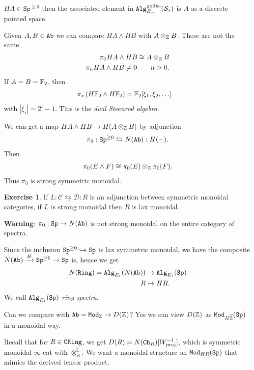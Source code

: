 \documentclass[12pt]{amsart}
\theoremstyle{definition}
\newtheorem{exercise}[theorem]{Exercise}
\newcommand{\HZ}{H\widetilde{\mathbb{Z}}}
\let\smashprod\wedge
\providecommand{\Sp}{\texttt{Sp}}
\providecommand{\Sp}{\text{Sp}}
\begin{document}
$HA \in \Sp^{\ge 0}$ then the associated element in $\texttt{Alg}_{E_\infty}^\text{gplike}(\mathcal{S}_\ast)$ is $A$ as a discrete pointed space.

Given $A,B\in \texttt{Ab}$ we can compare $HA \smashprod HB$ with $A \otimes_{\mathbb{Z}} B$. These are not the same.
\begin{align*}
    \pi_0 HA \smashprod HB \cong A \otimes_\Z B \\
    \pi_n HA \smashprod HB \ne 0 \quad\quad n>0.
\end{align*}
If $A=B=\mathbb{F}_2$, then
\begin{align*}
    \pi_\ast \left( H\F_2 \smashprod H\F_2 \right) &= \F_2[\xi_1,\xi_2,\ldots]
\end{align*}
with $|\xi_i|=2^i-1$. This is the \textit{dual Steenrod algebra}.

We can get a map $HA \smashprod HB \to H(A \otimes_\Z B)$ by adjunction
\begin{align*}
    \pi_0 : \Sp^{\ge 0} \leftrightarrows N(\Ab): H(-).
\end{align*}
Then
\begin{align*}
    \pi_0(E\smashprod F) \cong \pi_0(E) \otimes_\Z \pi_0(F).
\end{align*}
Thus $\pi_0$ is strong symmetric monoidal.

\begin{exercise} If $L: \mathscr{C} \leftrightarrows \mathscr{D}: R$ is an adjunction between symmetric monoidal categories, if $L$ is strong monoidal then $R$ is lax monoidal.
\end{exercise}

\textbf{Warning}: $\pi_0: \Sp \to N(\Ab)$ is not strong monoidal on the entire category of spectra.

Since the inclusion $\Sp^{\ge 0} \hookto \Sp$ is lax symmetric monoidal, we have the composite $N(\Ab) \xto{H} \Sp^{\ge 0} \to \Sp$ is, hence we get
\begin{align*}
    N(\Ring) = \Alg_{E_1}(N(\Ab)) &\to \Alg_{E_1}(\Sp) \\
    R &\mapsto HR.
\end{align*}
We call $\Alg_{E_1}(\Sp)$ \textit{ring spectra}.

Can we compare with $\texttt{Ab} = \texttt{Mod}_{\mathbb{Z}} \to D(\mathbb{Z})$? Yes we can view $D(\mathbb{Z})$ as $\Mod_{\HZ}(\Sp)$ in a monoidal way.

Recall that for $R\in \texttt{CRing}$, we get $D(R) = N(\texttt{Ch}_R)[W_\text{proj}^{-1}]$, which is symmetric monoidal $\infty$-cat with $\otimes_R^\mathbb{L}$. We want a monoidal structure on $\Mod_{HR}(\Sp)$ that mimics the derived tensor product.
\end{document}
